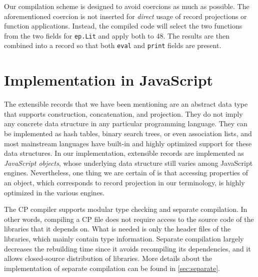 Our compilation scheme is designed to avoid coercions as much as possible. The
aforementioned coercion is not inserted for \emph{direct} usage of record
projections or function applications. Instead, the compiled code will select the
two functions from the two fields for \lstinline{ep.Lit} and apply both to 48.
The results are then combined into a record so that both \lstinline{eval} and
\lstinline{print} fields are present.

\section{Implementation in JavaScript}

The extensible records that we have been mentioning are an abstract data type
that supports construction, concatenation, and projection. They do not imply any
concrete data structure in any particular programming language. They can be
implemented as hash tables, binary search trees, or even association lists, and
most mainstream languages have built-in and highly optimized support for these
data structures. In our implementation, extensible records are implemented as
\emph{JavaScript objects}, whose underlying data structure still varies among
JavaScript engines. Nevertheless, one thing we are certain of is that accessing
properties of an object, which corresponds to record projection in our
terminology, is highly optimized in the various engines.


The CP compiler supports modular type checking and separate compilation. In
other words, compiling a CP file does not require access to the source code of
the libraries that it depends on. What is needed is only the header files of the
libraries, which mainly contain type information. Separate compilation largely
decreases the rebuilding time since it avoids recompiling its dependencies, and
it allows closed-source distribution of libraries. More details about the
implementation of separate compilation can be found in \autoref{sec:separate}.

